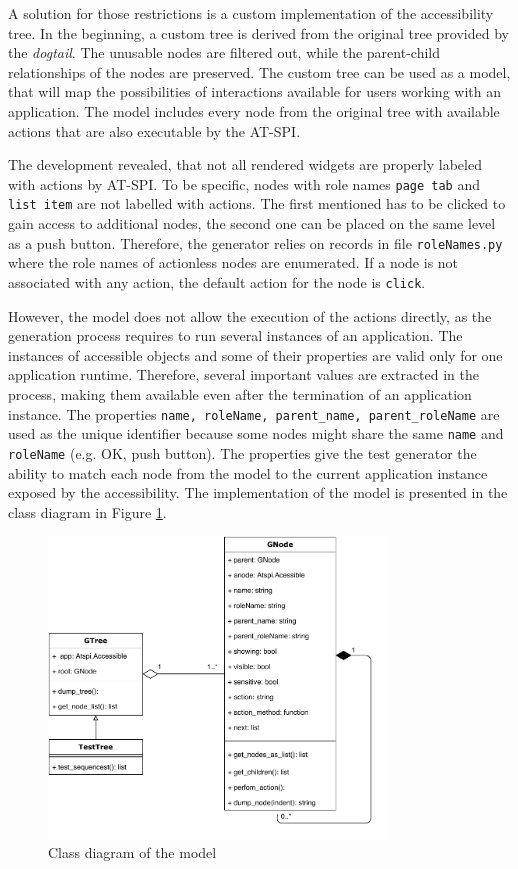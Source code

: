 A solution for those restrictions is a custom implementation of the accessibility tree. In the beginning, a custom tree is derived from the original tree provided by the \textit{dogtail}. The unusable nodes are filtered out, while the parent-child relationships of the nodes are preserved. The custom tree can be used as a model, that will map the possibilities of interactions available for users working with an application. The model includes every node from the original tree with available actions that are also executable by the AT-SPI. 

The development revealed, that not all rendered widgets are properly labeled with actions by AT-SPI. To be specific, nodes with role names \texttt{page tab} and \texttt{list item} are not labelled with actions. The first mentioned has to be clicked to gain access to additional nodes, the second one can be placed on the same level as a push button. Therefore, the generator relies on records in file \texttt{roleNames.py} where the role names of actionless nodes are enumerated. If a node is not associated with any action, the default action for the node is \texttt{click}.

However, the model does not allow the execution of the actions directly, as the generation process requires to run several instances of an application. The instances of accessible objects and some of their properties are valid only for one application runtime. Therefore, several important values are extracted in the process, making them available even after the termination of an application instance. The properties \texttt{name, roleName, parent\_name, parent\_roleName} are used as the unique identifier because some nodes might share the same \texttt{name} and \texttt{roleName} (e.g. OK, push button). The properties give the test generator the ability to match each node from the model to the current application instance exposed by the accessibility. The implementation of the model is presented in the class diagram in Figure \ref{tree_diagram}.

\begin{figure}[hbt]
	\centering
	\includegraphics[width=0.8\textwidth,clip]{obrazky-figures/tree_diagram.pdf}
	\caption{Class diagram of the model}
	\label{tree_diagram}
\end{figure}


